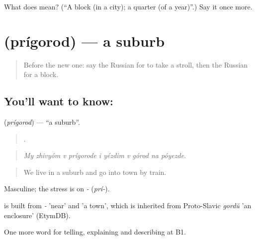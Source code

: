 \begin{tcolorbox}[breakable,colback=teal!4,colframe=teal!35!black,title={Before you move on}]
What does  mean? (\textquotedblleft{}A block (in a city); a quarter (of a year)\textquotedblright{}.) Say it once more.
\end{tcolorbox}
\section[\texorpdfstring{\ru{пригород} (prígorod)}{пригород (prígorod)}]{ (prígorod) — a suburb}

\label{lesson:RU-C443-prigorod}



\begin{quote}
Before the new one: say the Russian for to take a stroll, then the Russian for a block.
\end{quote}

\subsection*{You'll want to know: }
\textbf{} (\emph{prígorod}) — \textquotedblleft{}a suburb\textquotedblright{}.

\begin{quote}
         .
\end{quote}

\begin{quote}
\emph{My zhivyóm v prígorode i yézdim v górod na póyezde.}
\end{quote}

\begin{quote}
We live in a suburb and go into town by train.
\end{quote}

Masculine; the stress is on \emph{-} (\emph{prí-}).

\begin{cousinweb}
\emph{} is built from \emph{-} 'near' and \emph{} 'a town', which is inherited from Proto-Slavic \emph{gordŭ} 'an enclosure' (EtymDB).
\end{cousinweb}

\begin{grammarlens}[title={What you've built}]
One more word for telling, explaining and describing at B1.
\end{grammarlens}

